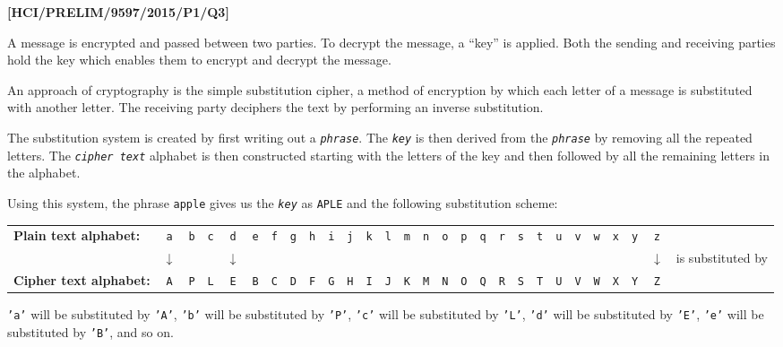 \item \textbf{{[}HCI/PRELIM/9597/2015/P1/Q3{]} }

A message is encrypted and passed between two parties. To decrypt
the message, a \textquotedblleft key\textquotedblright{} is applied.
Both the sending and receiving parties hold the key which enables
them to encrypt and decrypt the message. 

An approach of cryptography is the simple substitution cipher, a method
of encryption by which each letter of a message is substituted with
another letter. The receiving party deciphers the text by performing
an inverse substitution. 

The substitution system is created by first writing out a \texttt{\emph{phrase}}.
The \texttt{\emph{key}} is then derived from the \texttt{\emph{phrase}}
by removing all the repeated letters. The \texttt{\emph{cipher text}}
alphabet is then constructed starting with the letters of the key
and then followed by all the remaining letters in the alphabet. 

Using this system, the phrase \textquotedbl\texttt{apple}\textquotedbl{}
gives us the \texttt{\emph{key}} as \textquotedbl\texttt{APLE}\textquotedbl{}
and the following substitution scheme: 

\begin{tabular}{lccccccccccccccccccccccccccc}
\textbf{Plain text alphabet:} & \texttt{a} & \texttt{b} & \texttt{c} & \texttt{d} & \texttt{e} & \texttt{f} & \texttt{g} & \texttt{h} & \texttt{i} & \texttt{j} & \texttt{k} & \texttt{l} & \texttt{m} & \texttt{n} & \texttt{o} & \texttt{p} & \texttt{q} & \texttt{r} & \texttt{s} & \texttt{t} & \texttt{u} & \texttt{v} & \texttt{w} & \texttt{x} & \texttt{y} & \texttt{z} & \tabularnewline
 & \texttt{$\downarrow$} &  &  & \texttt{$\downarrow$} &  &  &  &  &  &  &  &  &  &  &  &  &  &  &  &  &  &  &  &  &  & \texttt{$\downarrow$} & is substituted by\tabularnewline
\textbf{Cipher text alphabet:} & \texttt{A} & \texttt{P} & \texttt{L} & \texttt{E} & \texttt{B} & \texttt{C} & \texttt{D} & \texttt{F} & \texttt{G} & \texttt{H} & \texttt{I} & \texttt{J} & \texttt{K} & \texttt{M} & \texttt{N} & \texttt{O} & \texttt{Q} & \texttt{R} & \texttt{S} & \texttt{T} & \texttt{U} & \texttt{V} & \texttt{W} & \texttt{X} & \texttt{Y} & \texttt{Z} & \tabularnewline
\end{tabular}

\texttt{'a'} will be substituted by \texttt{'A'}, \texttt{'b'} will
be substituted by \texttt{'P'}, \texttt{'c'} will be substituted by
\texttt{'L'}, \texttt{'d'} will be substituted by \texttt{'E'}, \texttt{'e'}
will be substituted by \texttt{'B'}, and so on. 

